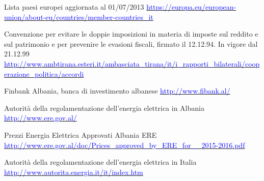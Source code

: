 \begin{thebibliography}{99}

	 Lista paesi europei aggiornata al 01/07/2013 \newline 
			\href{https://europa.eu/european-union/about-eu/countries/member-countries\_it}{\textcolor{blue}{	https://europa.eu/european-union/about-eu/countries/member-countries\_it}}	
	
	 Convenzione per evitare le doppie imposizioni in materia di imposte sul reddito e sul patrimonio e per prevenire le evasioni fiscali, firmato il 12.12.94. In vigore dal 21.12.99 \newline 
			\href{http://www.ambtirana.esteri.it/ambasciata\_tirana/it/i\_rapporti\_bilaterali/cooperazione\_politica/accordi	}{\textcolor{blue}{http://www.ambtirana.esteri.it/ambasciata\_tirana/it/i\_rapporti\_bilaterali/cooperazione\_politica/accordi}}			

	 Finbank Albania, banca di investimento albanese \newline 
			\href{http://www.fibank.al/}{\textcolor{blue}{http://www.fibank.al/}}			

	 Autorità della regolamentazione dell'energia elettrica in Albania \newline 
			\href{http://www.ere.gov.al/}{\textcolor{blue}{http://www.ere.gov.al/}}

	 Prezzi Energia Elettrica Approvati Albania ERE \newline 
			\href{http://www.ere.gov.al/doc/Prices\_approved\_by\_ERE\_for\_\_2015-2016.pdf}{\textcolor{blue}{http://www.ere.gov.al/doc/Prices\_approved\_by\_ERE\_for\_\_2015-2016.pdf}}



	 Autorità della regolamentazione dell'energia elettrica in Italia \newline 
			\href{http://www.autorita.energia.it/it/index.htm}{\textcolor{blue}{http://www.autorita.energia.it/it/index.htm}}
	

	
	
	
\end{thebibliography}